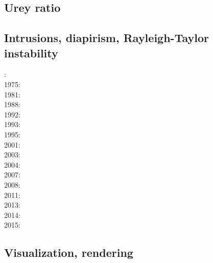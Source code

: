 \subsection{Urey ratio}

\cite{kore08}
\cite{nata12} 

\subsection*{Intrusions, diapirism, Rayleigh-Taylor instability}

: \cite{bers72}\\
1975: \cite{dixo75}\\
1981: \cite{brpo81}\\
1988: \cite{sccm88}\\
1992: \cite{vayv92}\cite{zaju92}\cite{wein92}\cite{wesc92}\cite{veja92}\\
1993: \cite{kesb93}\cite{nabr93}\cite{potp93}\cite{povp93}\cite{vasv93}\cite{pocp93}
      \cite{popt93}\cite{wein93}\\
1995: \cite{wepo95}\cite{bisc95}\cite{wepo95}\\
2001: \cite{kapo01}\\
2003: \cite{geur03}\cite{vavs03}\\
2004: \cite{gepm04}\cite{istt04}\cite{geur04}\\
2007: \cite{gebu07}\\
2008: \cite{buge08}\cite{zlfd08}\cite{mohc98}\\
2011: \cite{ellw11}\cite{pege11}\\
2013: \cite{fusc13}\\
2014: \cite{feka14b}\\
2015: \cite{feka15}\cite{fuks15}

\subsection*{Visualization, rendering}

\cite{faha}
\cite{chzy08}
\cite{stmt08}
\cite{cram18}

